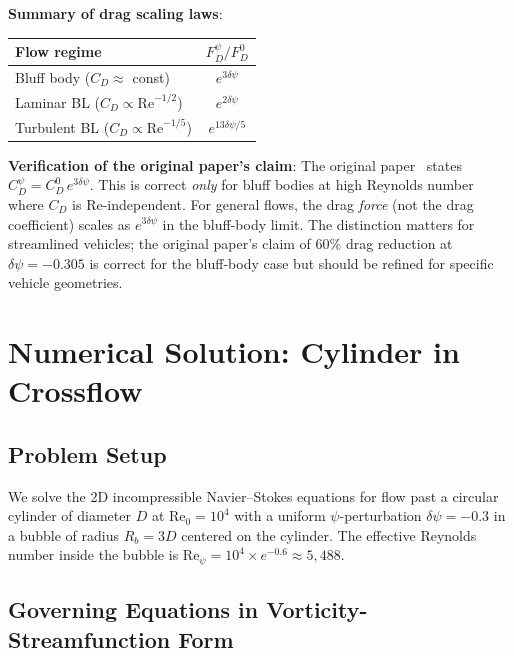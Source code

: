 \documentclass[12pt,twocolumn]{article}
\newcommand{\Rey}{\mathrm{Re}}
\newcommand{\dpsi}{\delta\psi}
\begin{document}
\textbf{Summary of drag scaling laws}:
\begin{center}
\begin{tabular}{@{}lc@{}}
\toprule
\textbf{Flow regime} & $F_D^\psi/F_D^0$ \\
\midrule
Bluff body ($C_D \approx$ const) & $e^{3\dpsi}$ \\
Laminar BL ($C_D \propto \Rey^{-1/2}$) & $e^{2\dpsi}$ \\
Turbulent BL ($C_D \propto \Rey^{-1/5}$) & $e^{13\dpsi/5}$ \\
\bottomrule
\end{tabular}
\end{center}

\textbf{Verification of the original paper's claim}: The original
paper~\cite{alcock2026drag} states $C_D^\psi = C_D^0\,e^{3\dpsi}$.
This is correct \emph{only} for bluff bodies at high Reynolds number where
$C_D$ is $\Rey$-independent. For general flows, the drag \emph{force}
(not the drag coefficient) scales as $e^{3\dpsi}$ in the bluff-body limit.
The distinction matters for streamlined vehicles; the original paper's
claim of 60\% drag reduction at $\dpsi = -0.305$ is correct for the
bluff-body case but should be refined for specific vehicle geometries.

\section{Numerical Solution: Cylinder in Crossflow}
\label{sec:numerical}

\subsection{Problem Setup}

We solve the 2D incompressible Navier--Stokes equations for flow past a
circular cylinder of diameter $D$ at $\Rey_0 = 10^4$ with a uniform
$\psi$-perturbation $\dpsi = -0.3$ in a bubble of radius $R_b = 3D$
centered on the cylinder. The effective Reynolds number inside the bubble
is $\Rey_\psi = 10^4 \times e^{-0.6} \approx 5{,}488$.

\subsection{Governing Equations in Vorticity-Streamfunction Form}
\end{document}
